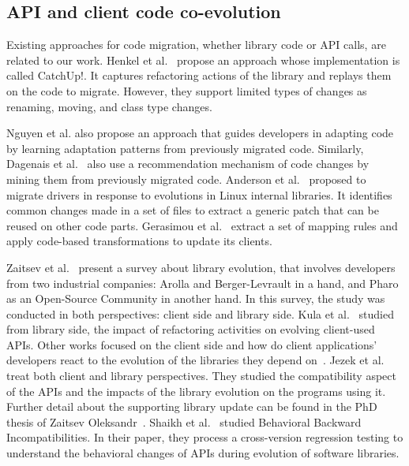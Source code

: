  
 \subsection{API and client code co-evolution}
 \label{API_evolution}
 
 
 Existing approaches for code migration, whether library code or API calls, are related to our work. %
   Henkel et al.~\cite{henkel2005catchup} propose an approach whose implementation is called CatchUp!. It captures refactoring actions of the library and replays them on the code to migrate. However, they support limited types of changes as renaming, moving, and class type changes. 
 
 Nguyen et al. \cite{nguyen2010graph} also propose an approach that guides developers in adapting code by learning adaptation patterns from previously migrated code. Similarly, Dagenais et al.~\cite{dagenais2011recommending,5070565,10.1145/1932682.1869486} also use a recommendation mechanism of code changes by mining them from previously migrated code. 
 Anderson et al.~\cite{andersen2010generic} proposed to migrate drivers in response to evolutions in Linux internal libraries. It identifies common changes made in a set of files to extract a generic patch that can be reused on other code parts. Gerasimou et al.~\cite{10.1145/3194793.3194798} extract a set of mapping rules and apply code-based transformations to update its clients.
 
 
 Zaitsev et al.~\cite{10043250} present a survey about library evolution, that involves developers from two industrial companies: Arolla and Berger-Levrault in a hand, and Pharo as an Open-Source Community in another hand. In this survey, the study was conducted in both perspectives: client side and library side. Kula et al.~\cite{10.1016/j.infsof.2017.09.007} studied from library side, the impact of refactoring activities on evolving client-used APIs.
 Other works focused on the client side and how do client applications' developers react to the evolution of the libraries they depend on~\cite{10.1145/2393596.2393662,7332471,7816485,7884616,10.1007/s11219-016-9344-4,10.1007/s10664-017-9521-5}. Jezek et al. \cite{10.1016/j.infsof.2015.02.014} treat both client and library perspectives. They studied the compatibility aspect of the APIs and the impacts of the library evolution on the programs using it. Further detail about the supporting library update can be found in the PhD thesis of Zaitsev Oleksandr~\cite{zaytsev:tel-03998632}. Shaikh et al.~\cite{10.1145/3092703.3092721} studied Behavioral Backward Incompatibilities. In their paper, they process a cross-version regression testing to understand the behavioral changes of APIs during evolution of software libraries.

